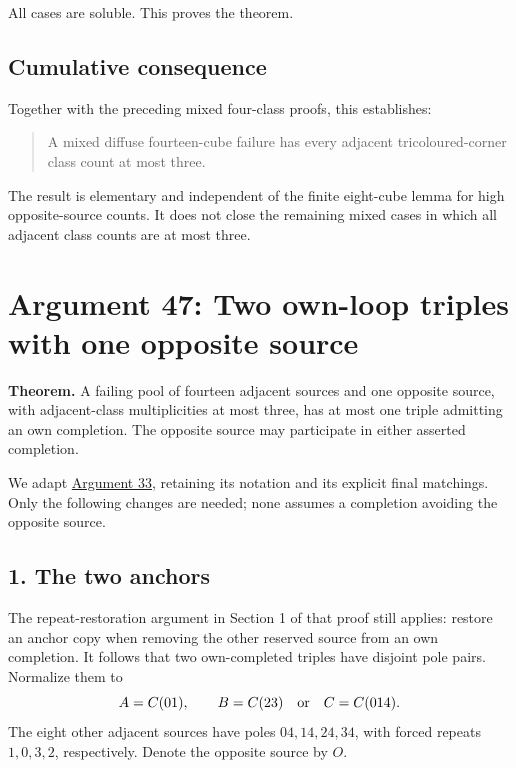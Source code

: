 \documentclass[
  10pt,
]{article}
\begin{document}
All cases are soluble. This proves the theorem.

\hypertarget{cumulative-consequence}{%
\subsection*{Cumulative consequence}\label{cumulative-consequence}}

Together with the preceding mixed four-class proofs, this establishes:

\begin{quote}
A mixed diffuse fourteen-cube failure has every adjacent
tricoloured-corner class count at most three.
\end{quote}

The result is elementary and independent of the finite eight-cube lemma
for high opposite-source counts. It does not close the remaining mixed
cases in which all adjacent class counts are at most three.

\hypertarget{arg-47}{%
\section{Argument 47: Two own-loop triples with one opposite
source}\label{arg-47}}

\textbf{Theorem.} A failing pool of fourteen adjacent sources and one
opposite source, with adjacent-class multiplicities at most three, has
at most one triple admitting an own completion. The opposite source may
participate in either asserted completion.

We adapt \protect\hyperlink{arg-33}{Argument 33}, retaining its notation
and its explicit final matchings. Only the following changes are needed;
none assumes a completion avoiding the opposite source.

\hypertarget{the-two-anchors}{%
\subsection*{1. The two anchors}\label{the-two-anchors}}

The repeat-restoration argument in Section 1 of that proof still
applies: restore an anchor copy when removing the other reserved source
from an own completion. It follows that two own-completed triples have
disjoint pole pairs. Normalize them to \[
A=C(01),\qquad B=C(23)\quad\hbox{or}\quad C=C(014).
\] The eight other adjacent sources have poles \(04,14,24,34\), with
forced repeats \(1,0,3,2\), respectively. Denote the opposite source by
\(O\).
\end{document}
